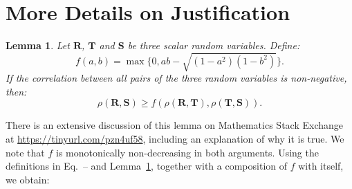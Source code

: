 \documentclass[11pt]{article}
\newcommand{\rv}[1]{\mathbf{#1}}
\newtheorem{lemma}{Lemma}
\begin{document}




\appendix

\newpage

\section{More Details on Justification}
\label{app:justification}

\begin{lemma}
Let $\rv{R}$, $\rv{T}$ and $\rv{S}$ be three scalar random variables. Define:
\begin{equation}
    f(a,b) = \max \{ 0, ab - \sqrt{(1-a^2)(1-b^2)} \}.
\end{equation}
If the correlation between all pairs of the three random variables is non-negative, then:
\begin{equation}
    \rho(\rv{R}, \rv{S}) \ge f(\rho(\rv{R}, \rv{T}), \rho(\rv{T}, \rv{S})).
\end{equation}
    \label{lemma:rho}
\end{lemma}
There is an extensive discussion of this lemma on Mathematics Stack Exchange at \url{https://tinyurl.com/pzn4uf58}, including an explanation of why it is true.
We note that $f$ is monotonically non-decreasing in both arguments.
Using the definitions in Eq.~-- and Lemma~\ref{lemma:rho}, together with a composition of $f$ with itself, we obtain:
\end{document}
